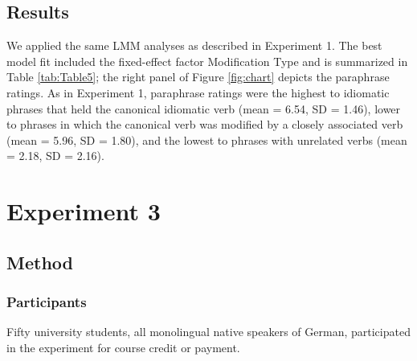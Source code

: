 \documentclass[output=paper]{langsci/langscibook}
\begin{document}
\begin{table}[]
\caption{\textit{Fixed Effects of the Predictors in the Linear Mixed-Effect Model for the Paraphrase Ratings in Experiment 2.}}
\label{tab:Table5}
\end{table}




\subsection{Results}

We applied the same LMM analyses as described in Experiment 1. The best model fit included the fixed-effect factor Modification Type and is summarized in Table \ref{tab:Table5}; the right panel of Figure \ref{fig:chart} depicts the paraphrase ratings. As in Experiment 1, paraphrase ratings were the highest to idiomatic phrases that held the canonical idiomatic verb (mean = 6.54, SD = 1.46), lower to phrases in which the canonical verb was modified by a closely associated verb (mean = 5.96, SD = 1.80), and the lowest to phrases with unrelated verbs (mean = 2.18, SD = 2.16). 

\section{Experiment 3}

\subsection{Method}

\subsubsection{Participants}

Fifty university students, all monolingual native speakers of German, participated in the experiment for course credit or payment.
\end{document}
